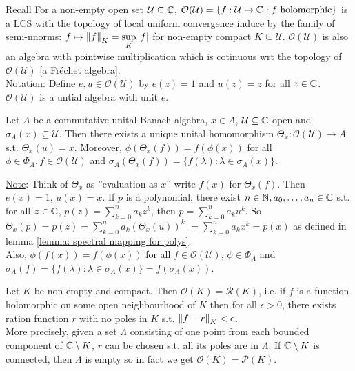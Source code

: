 \documentclass{article}
\begin{document}
\noindent\underline{Recall} For a non-empty open set $\mathcal{U}\subseteq\mathbb{C}$, $\mathcal{O}(\mathcal{U}) = \{f:\mathcal{U}\to \mathbb{C}: f \text{ holomorphic}\}$ is a LCS with the topology of local uniform convergence induce by the family of semi-nnorms: $f\mapsto \left\lVert f\right\rVert_K= \displaystyle\sup_K|f|$ for non-empty compact $K\subseteq\mathcal{U}$. $\mathcal{O}(\mathcal{U})$ is also an algebra with pointwise multiplication which is cotinuous wrt the topology of $\mathcal{O}(\mathcal{U})$ [a Fr\'{e}chet algebra].\\

\noindent\underline{Notation}: Define $e, u \in \mathcal{O}(\mathcal{U})$ by $e(z) = 1$ and $u(z) = z$ for all $z\in \mathbb{C}$. $\mathcal{O}(\mathcal{U})$ is a untial algebra with unit $e$.

\begin{theorem}\label{thm: HFC}
    Let $A$ be a commutative unital Banach algebra, $x\in A$, $\mathcal{U}\subseteq\mathbb{C}$ open and $\sigma_A(x)\subseteq\mathcal{U}$. Then there exists a unique unital homomorphism $\Theta_x:\mathcal{O}(\mathcal{U})\to A$ s.t. $\Theta_x(u)=x$. Moreover, $\phi\left(\Theta_x(f)\right) = f(\phi(x))$ for all $\phi\in \Phi_A, f\in \mathcal{O}(\mathcal{U})$ and $\sigma_A\left(\Theta_x(f)\right) = \{f(\lambda):\lambda\in \sigma_A(x)\}$.
\end{theorem}

\noindent\underline{Note}: Think of $\Theta_x$ as ''evaluation as $x$''-write $f(x)$ for $\Theta_x(f)$. Then $e(x) = 1$, $u(x) = x$. If $p$ is a polynomial, there exist $n\in \mathbb{N}, a_0, \dots, a_n\in \mathbb{C}$ s.t. for all $z\in \mathbb{C}$, $p(z) = \displaystyle\sum^n_{k=0}a_kz^k$, then $p = \displaystyle\sum^n_{k=0}a_ku^k$. So $\Theta_x(p) = p(z) =\displaystyle\sum^n_{k=0}a_k\left(\Theta_x(u)\right)^k$
$= \displaystyle\sum^n_{k=0}a_kx^k=p(x)$ as defined in lemma \ref{lemma: spectral mapping for polys}.\\
Also, $\phi(f(x))=f(\phi(x))$ for all $f\in \mathcal{O}(\mathcal{U})$, $\phi\in\Phi_A$ and $\sigma_A(f) = \{f(\lambda):\lambda\in\sigma_A(x)\}=f(\sigma_A(x))$.

\begin{theorem}\label{thm: Runge approx thm}
    Let $K$ be non-empty and compact. Then $\mathcal{O}(K) = \mathcal{R}(K)$, i.e. if $f$ is a function holomorphic on some open neighbourhood of $K$ then for all $\epsilon>0$, there exists ration function $r$ with no poles in $K$ s.t. $\left\lVert f-r\right\rVert_K<\epsilon$.\\

    More precisely, given a set $\Lambda$ consisting of one point from each bounded component of $\mathbb{C}\setminus K$, $r$ can be chosen s.t. all its poles are in $\Lambda$. If $\mathbb{C}\setminus K$ is connected, then $\Lambda$ is empty so in fact we get $\mathcal{O}(K) = \mathcal{P}(K)$.
\end{theorem}
\end{document}
